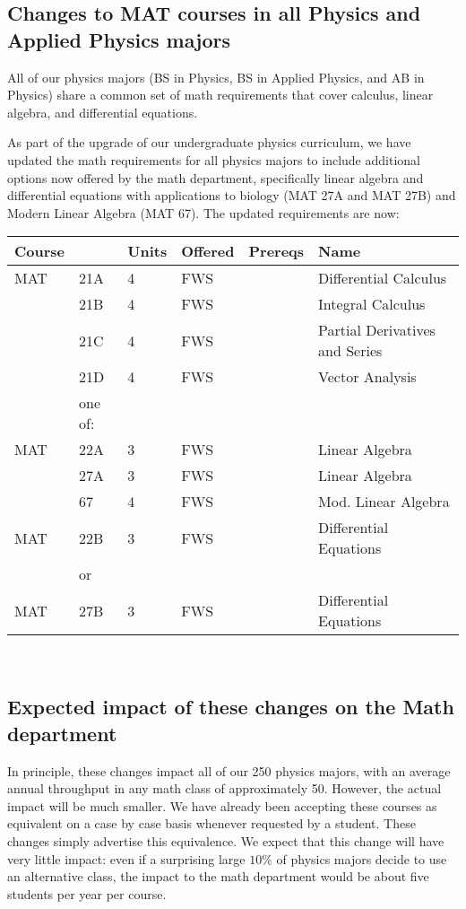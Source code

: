 \documentclass[12pt]{article}
\begin{document}
\subsection{Changes to MAT courses in all Physics and Applied Physics majors}

All of our physics majors (BS in Physics, BS in Applied Physics, and
AB in Physics) share a common set of math requirements that cover
calculus, linear algebra, and differential equations.

As part of the upgrade of our undergraduate physics curriculum, we
have updated the math requirements for all physics majors to include
additional options now offered by the math department, specifically
linear algebra and differential equations with applications to biology
(MAT 27A and MAT 27B) and Modern Linear Algebra (MAT 67).  The updated
requirements are now:
\vskip 0.25cm
\noindent
\begin{tabular}{|llllll|}
\hline
Course & & Units & Offered & Prereqs & Name \\
\hline
MAT & 21A & 4 & FWS & & Differential Calculus\\ 
    & 21B & 4 & FWS &  & Integral Calculus \\ 
    & 21C & 4 & FWS &  & Partial Derivatives and Series\\ 
    & 21D & 4 & FWS &  & Vector Analysis\\
\hline
    & one of:  & & & & \\
MAT & 22A & 3 & FWS &  & Linear Algebra\\
    & 27A & 3 & FWS &  & Linear Algebra\\
    & 67  & 4 & FWS &  & Mod. Linear Algebra\\
\hline
MAT & 22B & 3 & FWS &  & Differential Equations\\
    & or  & & & & \\
MAT & 27B & 3 & FWS &  & Differential Equations\\ 
\hline
\end{tabular}\\


\subsection{Expected impact of these changes on the Math department}

In principle, these changes impact all of our 250 physics majors, with
an average annual throughput in any math class of approximately 50.
However, the actual impact will be much smaller.  We have already been
accepting these courses as equivalent on a case by case basis whenever
requested by a student.  These changes simply advertise this
equivalence.  We expect that this change will have very little impact:
even if a surprising large $10\%$ of physics majors decide to use an
alternative class, the impact to the math department would be about
five students per year per course.
\end{document}
